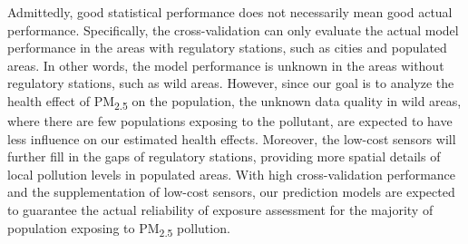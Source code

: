 \documentclass[11pt]{article}
\newcommand{\tsub}{\textsubscript}
\begin{document}
\begin{enumerate*}[{[1)]}]
    \item Admittedly, good statistical performance does not necessarily mean good actual performance. Specifically, the cross-validation can only evaluate the actual model performance in the areas with regulatory stations, such as cities and populated areas. In other words, the model performance is unknown in the areas without regulatory stations, such as wild areas. However, since our goal is to analyze the health effect of PM\tsub{2.5} on the population, the unknown data quality in wild areas, where there are few populations exposing to the pollutant, are expected to have less influence on our estimated health effects. Moreover, the low-cost sensors will further fill in the gaps of regulatory stations, providing more spatial details of local pollution levels in populated areas. With high cross-validation performance and the supplementation of low-cost sensors, our prediction models are expected to guarantee the actual reliability of exposure assessment for the majority of population exposing to PM\tsub{2.5} pollution. 
\end{enumerate*}
\end{document}

